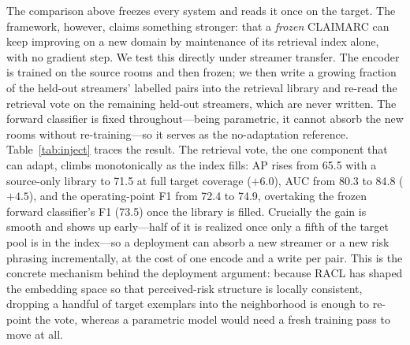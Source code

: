 \documentclass[11pt]{article}
\begin{document}
The comparison above freezes every system and reads it once on the target. The
framework, however, claims something stronger: that a \emph{frozen} CLAIMARC can
keep improving on a new domain by maintenance of its retrieval index alone, with
no gradient step. We test this directly under streamer transfer. The encoder is
trained on the source rooms and then frozen; we then write a growing fraction of
the held-out streamers' labelled pairs into the retrieval library and re-read the
retrieval vote on the remaining held-out streamers, which are
never written. The forward classifier is fixed throughout---being parametric, it
cannot absorb the new rooms without re-training---so it serves as the
no-adaptation reference. Table~\ref{tab:inject} traces the result. The retrieval
vote, the one component that can adapt, climbs monotonically as the index fills:
AP rises from 65.5 with a source-only library to 71.5 at full target coverage
($+6.0$), AUC from 80.3 to 84.8 ($+4.5$), and the operating-point F1 from 72.4 to
74.9, overtaking the frozen forward classifier's F1 (73.5) once the library is
filled. Crucially the gain is smooth and shows up early---half of it is realized
once only a fifth of the target pool is in the index---so a deployment can absorb
a new streamer or a new risk phrasing incrementally, at the cost of one encode
and a write per pair. This is the concrete mechanism behind the deployment
argument: because RACL has shaped the embedding space so that perceived-risk
structure is locally consistent, dropping a handful of target exemplars into the
neighborhood is enough to re-point the vote, whereas a parametric model would
need a fresh training pass to move at all.
\end{document}
